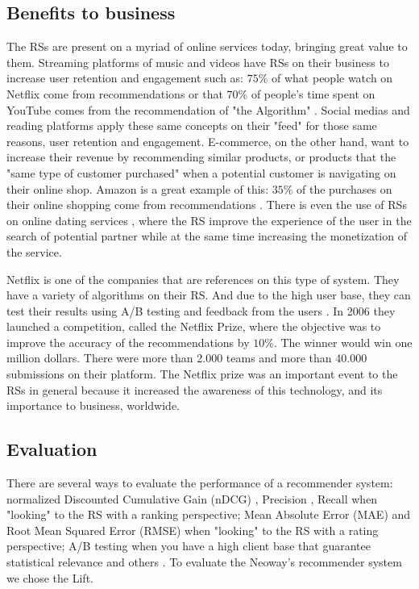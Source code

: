 \subsection{Benefits to business}

The RSs are present on a myriad of online services today, bringing great value to them. Streaming platforms of music and videos have RSs on their business to increase user retention and engagement such as: $75\%$ of what people watch on Netflix come from recommendations \cite{HowretailerscankeepupwithconsumersMcKinsey} or that $70\%$ of people's time spent on YouTube comes from the recommendation of "the Algorithm" \cite{CES2018YouTubesAIrecommendationsdrive70percentofviewingCNET}. Social medias and reading platforms apply these same concepts on their "feed" for those same reasons, user retention and engagement. E-commerce, on the other hand, want to increase their revenue by recommending similar products, or products that the "same type of customer purchased" when a potential customer is navigating on their online shop. Amazon is a great example of this: $35\%$ of the purchases on their online shopping come from recommendations \cite{HowretailerscankeepupwithconsumersMcKinsey}. There is even the use of RSs on online dating services \cite{brozovsky2007recommender}, where the RS improve the experience of the user in the search of potential partner while at the same time increasing the monetization of the service.

Netflix is one of the companies that are references on this type of system. They have a variety of algorithms on their RS. And due to the high user base, they can test their results using A/B testing and feedback from the users \cite{gomez2016netflix}. In 2006 they launched a competition, called the Netflix Prize, where the objective was to improve the accuracy of the recommendations by $10\%$. The winner would win one million dollars. There were more than 2.000 teams and more than 40.000 submissions on their platform. The Netflix prize was an important event to the RSs in general because it increased the awareness of this technology, and its importance to business, worldwide. 

\subsection{Evaluation}
\label{ch:evaluation}

There are several ways to evaluate the performance of a recommender system: normalized Discounted Cumulative Gain (nDCG) \cite{jarvelin2002cumulated}, Precision \cite{Precision-rs-metric}, Recall \cite{cremonesi2010performance} when "looking" to the RS with a ranking perspective; Mean Absolute Error (MAE) \cite{breese1998empirical} and Root Mean Squared Error (RMSE) \cite{bennett2007netflix} when "looking" to the RS with a rating perspective; A/B testing when you have a high client base that guarantee statistical relevance and others \cite{parra2013recommender}. To evaluate the Neoway's recommender system we chose the Lift.

